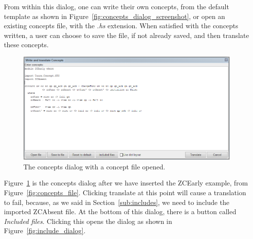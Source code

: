 \documentclass[british,technote,compsoc]{IEEEtran}
\begin{document}
\noindent From within this dialog, one can write their own concepts, from the default template as shown in Figure~\ref{fig:concepts_dialog_screenshot}, or open an existing concepts file, with the  
\emph{.hs} extension. When satisfied with the concepts written, a user can choose to save the file, if not already saved, and then translate these concepts.

\begin{figure}[H]
\begin{centering}
\includegraphics[scale=0.5]{images/concepts_dialog_ZCEarly.png}
\par\end{centering}

\begin{centering}
\protect\caption{\label{fig:concepts_dialog_ZCEarly}The concepts dialog with a concept file opened.}

\par\end{centering}

\end{figure}

\noindent Figure~\ref{fig:concepts_dialog_ZCEarly} is the concepts dialog after we have inserted the ZCEarly example, from Figure~\ref{fig:concepts_file}. Clicking translate at this point 
will cause a translation to fail, because, as we said in Section~\ref{sub:includes}, we need to include the imported ZCAbsent file. At the bottom of this dialog, there is a button called
 \emph{Included files}. Clicking this opens the dialog as shown in Figure~\ref{fig:include_dialog}.
\end{document}
